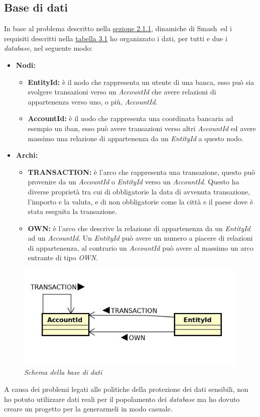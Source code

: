 \subsection{Base di dati}
In base al problema descritto nella \hyperref[sec:prob]{sezione 2.1.1}, dinamiche di Smash\textregistered\ ed i requisiti descritti nella \hyperref[tab:rec]{tabella 3.1} ho organizzato i dati, per tutti e due i \textit{database}, nel seguente modo:
\begin{itemize}
\item{\textbf{Nodi:}}
\begin{itemize}
\item{\textbf{EntityId:}} è il nodo che rappresenta un utente di una banca, esso può sia svolgere transazioni verso un \textit{AccountId} che avere relazioni di appartenenza verso uno, o più, \textit{AccountId}.
\item{\textbf{AccountId:}} è il nodo che rappresenta una coordinata bancaria ad esempio un iban, esso può avere transazioni verso altri \textit{AccountId} ed avere massimo una relazione di appartenenza da un \textit{EntityId} a questo nodo.
\end{itemize}
\item{\textbf{Archi:}}
\begin{itemize}
\item{\textbf{TRANSACTION:}} è l'arco che rappresenta una transazione, questo può provenire da un \textit{AccountId} o \textit{EntityId} verso un \textit{AccountId}. Questo ha diverse proprietà tra cui di obbligatorie la data di avvenuta transazione, l'importo e la valuta, e di non obbligatorie come la città e il paese dove è stata eseguita la transazione.
\item{\textbf{OWN:}} è l'arco che descrive la relazione di appartenenza da un \textit{EntityId} ad un \textit{AccountId}. Un \textit{EntityId} può avere un numero a piacere di relazioni di appartenenza, al contrario un \textit{AccountId} può avere al massimo un arco entrante di tipo \textit{OWN}.
\end{itemize}
\end{itemize}
\newpage
\begin{figure}[!ht]
	\centering
	\includegraphics[scale=0.4]{immagini/graph.jpg}
	\caption{\textit{Schema della base di dati}}
\end{figure}
A causa dei problemi legati alle politiche della protezione dei dati sensibili, non ho potuto utilizzare dati reali per il popolamento dei \textit{database} ma ho dovuto creare un progetto per la generarmeli in modo casuale.
